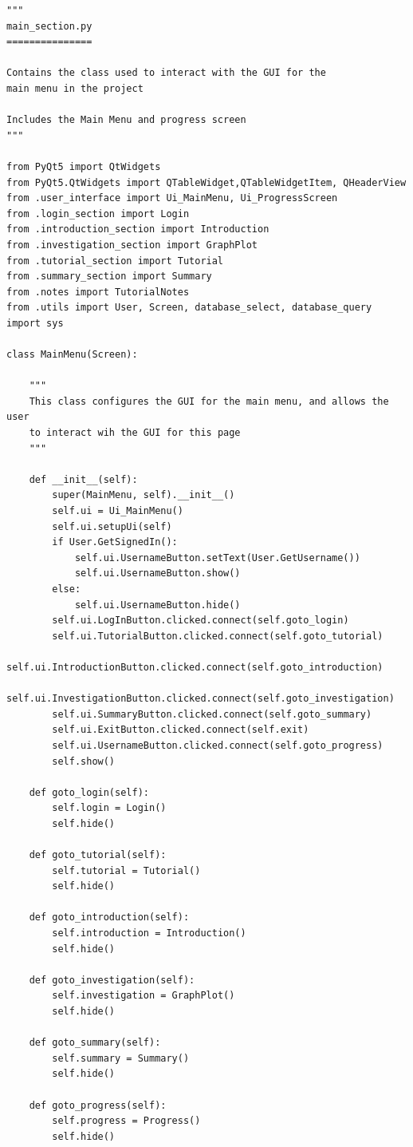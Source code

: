 \documentclass{article}
\begin{document}
\begin{lstlisting}
"""
main_section.py
===============

Contains the class used to interact with the GUI for the
main menu in the project

Includes the Main Menu and progress screen
"""

from PyQt5 import QtWidgets
from PyQt5.QtWidgets import QTableWidget,QTableWidgetItem, QHeaderView
from .user_interface import Ui_MainMenu, Ui_ProgressScreen
from .login_section import Login
from .introduction_section import Introduction
from .investigation_section import GraphPlot
from .tutorial_section import Tutorial
from .summary_section import Summary
from .notes import TutorialNotes
from .utils import User, Screen, database_select, database_query
import sys

class MainMenu(Screen):

    """
    This class configures the GUI for the main menu, and allows the user
    to interact wih the GUI for this page
    """

    def __init__(self):
        super(MainMenu, self).__init__()
        self.ui = Ui_MainMenu()
        self.ui.setupUi(self)
        if User.GetSignedIn():
            self.ui.UsernameButton.setText(User.GetUsername())
            self.ui.UsernameButton.show()
        else:
            self.ui.UsernameButton.hide()
        self.ui.LogInButton.clicked.connect(self.goto_login)
        self.ui.TutorialButton.clicked.connect(self.goto_tutorial)
        self.ui.IntroductionButton.clicked.connect(self.goto_introduction)
        self.ui.InvestigationButton.clicked.connect(self.goto_investigation)
        self.ui.SummaryButton.clicked.connect(self.goto_summary)
        self.ui.ExitButton.clicked.connect(self.exit)
        self.ui.UsernameButton.clicked.connect(self.goto_progress)
        self.show()

    def goto_login(self):
        self.login = Login()
        self.hide()

    def goto_tutorial(self):
        self.tutorial = Tutorial()
        self.hide()

    def goto_introduction(self):
        self.introduction = Introduction()
        self.hide()

    def goto_investigation(self):
        self.investigation = GraphPlot()
        self.hide()

    def goto_summary(self):
        self.summary = Summary()
        self.hide()

    def goto_progress(self):
        self.progress = Progress()
        self.hide()


\end{lstlisting}
\end{document}
